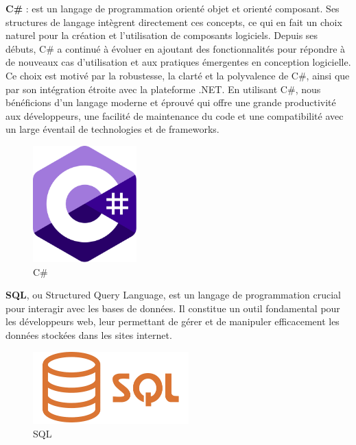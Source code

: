\textbf{C\#} : est un langage de programmation orienté objet et orienté composant. Ses structures de langage intègrent directement ces concepts, ce qui en fait un choix naturel pour la création et l'utilisation de composants logiciels. Depuis ses débuts, C\# a continué à évoluer en ajoutant des fonctionnalités pour répondre à de nouveaux cas d'utilisation et aux pratiques émergentes en conception logicielle. Ce choix est motivé par la robustesse, la clarté et la polyvalence de C\#, ainsi que par son intégration étroite avec la plateforme .NET. En utilisant C\#, nous bénéficions d'un langage moderne et éprouvé qui offre une grande productivité aux développeurs, une facilité de maintenance du code et une compatibilité avec un large éventail de technologies et de frameworks.
\\
\begin{figure}[H] 
    \centering
    \includegraphics[width=4cm]{Figures/csharp.png}
    \caption{C\#}
\end{figure}


\textbf{SQL}, ou Structured Query Language, est un langage de programmation crucial pour interagir avec les bases de données. Il constitue un outil fondamental pour les développeurs web, leur permettant de gérer et de manipuler efficacement les données stockées dans les sites internet.
\\
\begin{figure}[H] 
    \centering
    \includegraphics[width=6cm]{Figures/sql.png}
    \caption{SQL}
\end{figure}



